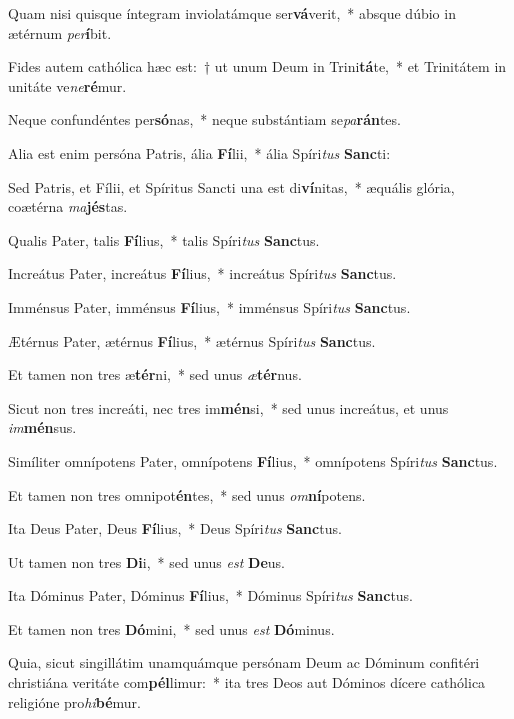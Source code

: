 \item Quam nisi quisque íntegram inviolatámque ser\textbf{vá}verit,~* absque dúbio in ætérnum \textit{per}\textbf{í}bit.
\item Fides autem cathólica hæc est:~† ut unum Deum in Trini\textbf{tá}te,~* et Trinitátem in unitáte ve\textit{ne}\textbf{ré}mur.
\item Neque confundéntes per\textbf{só}nas,~* neque substántiam se\textit{pa}\textbf{rán}tes.
\item Alia est enim persóna Patris, ália \textbf{Fí}lii,~* ália Spíri\textit{tus} \textbf{Sanc}ti:
\item Sed Patris, et Fílii, et Spíritus Sancti una est di\textbf{ví}nitas,~* æquális glória, coætérna \textit{ma}\textbf{jés}tas.
\item Qualis Pater, talis \textbf{Fí}lius,~* talis Spíri\textit{tus} \textbf{Sanc}tus.
\item Increátus Pater, increátus \textbf{Fí}lius,~* increátus Spíri\textit{tus} \textbf{Sanc}tus.
\item Imménsus Pater, imménsus \textbf{Fí}lius,~* imménsus Spíri\textit{tus} \textbf{Sanc}tus.
\item Ætérnus Pater, ætérnus \textbf{Fí}lius,~* ætérnus Spíri\textit{tus} \textbf{Sanc}tus.
\item Et tamen non tres æ\textbf{tér}ni,~* sed unus \textit{æ}\textbf{tér}nus.
\item Sicut non tres increáti, nec tres im\textbf{mén}si,~* sed unus increátus, et unus \textit{im}\textbf{mén}sus.
\item Simíliter omnípotens Pater, omnípotens \textbf{Fí}lius,~* omnípotens Spíri\textit{tus} \textbf{Sanc}tus.
\item Et tamen non tres omnipot\textbf{én}tes,~* sed unus \textit{om}\textbf{ní}potens.
\item Ita Deus Pater, Deus \textbf{Fí}lius,~* Deus Spíri\textit{tus} \textbf{Sanc}tus.
\item Ut tamen non tres \textbf{Di}i,~* sed unus \textit{est} \textbf{De}us.
\item Ita Dóminus Pater, Dóminus \textbf{Fí}lius,~* Dóminus Spíri\textit{tus} \textbf{Sanc}tus.
\item Et tamen non tres \textbf{Dó}mini,~* sed unus \textit{est} \textbf{Dó}minus.
\item Quia, sicut singillátim unamquámque persónam Deum ac Dóminum confitéri christiána veritáte com\textbf{pél}limur:~* ita tres Deos aut Dóminos dícere cathólica religióne pro\textit{hi}\textbf{bé}mur.
